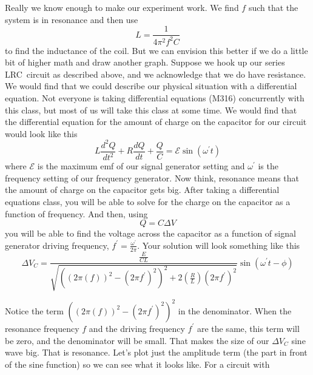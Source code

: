 Really we know enough to make our experiment work. We find $f$ such that the system is in resonance and then use 
\begin{equation*}
	L=\frac{1}{4\pi ^{2}f^{2}C}
\end{equation*}
to find the inductance of the coil. But we can envision this better if we do a little bit of higher math and draw another graph. Suppose we hook up our series LRC\ circuit as described above, and we acknowledge that we do have resistance. We would find that we could describe our physical situation with a differential equation. Not everyone is taking differential equations (M316) concurrently with this class, but most of us will take this class at some time. We would find that the differential equation for the amount of charge on the capacitor for our circuit would look like this
\begin{equation*}
	L\frac{d^{2}Q}{dt^{2}}+R\frac{dQ}{dt}+\frac{Q}{C}=\mathcal{E}\sin \left(\omega ^{\prime }t\right)
\end{equation*}
where $\mathcal{E}$ is the maximum emf of our signal generator setting and $\omega ^{\prime }$ is the frequency setting of our frequency generator. Now think, resonance means that the amount of charge on the capacitor gets big. After taking a differential equations class, you will be able to solve for the charge on the capacitor as a function of frequency. And then, using 
\begin{equation*}
	Q=C\Delta V
\end{equation*}
you will be able to find the voltage across the capacitor as a function of signal generator driving frequency, $f^{\prime }=\frac{\omega ^{\prime }}{2\pi }.$ Your solution will look something like this 
\begin{equation*}
	\Delta V_{C}=\frac{\frac{E}{CL}}{\sqrt{\left( \left( 2\pi \left( f\right)\right) ^{2}-\left( 2\pi f^{\prime }\right) ^{2}\right) ^{2}+2\left( \frac{R}{L}\right) \left( 2\pi f^{\prime }\right) ^{2}}}\sin \left( \omega ^{\prime}t-\phi \right)
\end{equation*}

Notice the term $\left( \left( 2\pi \left( f\right) \right)^{2}-\left( 2\pi f^{\prime }\right) ^{2}\right) ^{2}$ in the denominator. When the resonance frequency $f$ and the driving frequency $f^{\prime }$ are the same, this term will be zero, and the denominator will be small. That makes the size of our $\Delta V_{C}$ sine wave big. That is resonance. Let's plot just the amplitude term (the part in front of the sine function) so we can see what it looks like. For a circuit with

